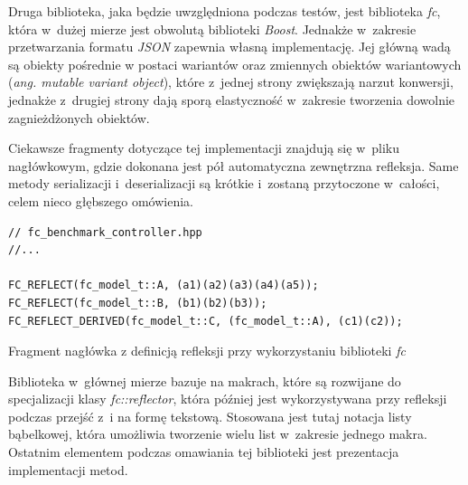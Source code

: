 \documentclass[12pt]{article}
\newcommand{\n}{\newline}
\newcommand{\nonpl}[1]{{\it #1}}
\newcommand{\code}[1]{{\it #1}}
\newcommand{\ang}[1]{\nonpl{ang. #1}}
\newcommand{\JSON}{\nonpl{JSON} }
\begin{document}
{{{				Druga biblioteka, jaka będzie uwzględniona podczas testów, jest biblioteka \nonpl{fc}\cite{fc_repo}, która w~dużej mierze jest obwolutą biblioteki
				\nonpl{Boost}\cite{boost}. Jednakże w~zakresie przetwarzania formatu \JSON zapewnia własną implementację. Jej główną wadą są obiekty pośrednie
				w postaci wariantów oraz zmiennych obiektów wariantowych (\ang{mutable variant object}), które z~jednej strony zwiększają narzut konwersji,
				jednakże z~drugiej strony dają sporą elastyczność w~zakresie tworzenia dowolnie zagnieżdżonych obiektów.\n

				Ciekawsze fragmenty dotyczące tej implementacji znajdują się w~pliku nagłówkowym, gdzie dokonana jest pół automatyczna zewnętrzna refleksja. Same
				metody serializacji i~deserializacji są krótkie i~zostaną przytoczone w~całości, celem nieco głębszego omówienia.\n

				\begin{captioned}[H]
					\begin{lstlisting}[frame=single]
// fc_benchmark_controller.hpp
//...

FC_REFLECT(fc_model_t::A, (a1)(a2)(a3)(a4)(a5));
FC_REFLECT(fc_model_t::B, (b1)(b2)(b3));
FC_REFLECT_DERIVED(fc_model_t::C, (fc_model_t::A), (c1)(c2));
					\end{lstlisting}
					\caption{ Fragment nagłówka z definicją refleksji przy wykorzystaniu biblioteki \nonpl{fc}}
					\label{fc_impl_header}
				\end{captioned}

				Biblioteka w~głównej mierze bazuje na makrach, które są rozwijane do specjalizacji klasy \code{fc::reflector}, która później jest
				wykorzystywana przy refleksji podczas przejść z~i na formę tekstową. Stosowana jest tutaj notacja listy bąbelkowej, która umożliwia
				tworzenie wielu list w~zakresie jednego makra. Ostatnim elementem podczas omawiania tej biblioteki jest prezentacja implementacji metod.\n


}}}
\end{document}
